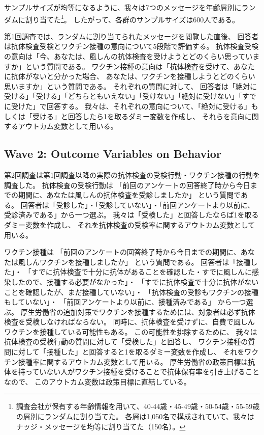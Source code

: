 \documentclass[
  11pt,
  a4paper,
]{article}
\begin{document}
サンプルサイズが均等になるように、我々は7つのメッセージを年齢層別にランダムに割り当てた\footnote{調査会社が保有する年齢情報を用いて、40-44歳・45-49歳・50-54歳・55-59歳の層別にランダムに割り当てた。
  各層は1,050名で構成されていて、我々はナッジ・メッセージを均等に割り当てた（150名）。}。
したがって、各群のサンプルサイズは600人である。

第1回調査では、ランダムに割り当てられたメッセージを閲覧した直後、
回答者は抗体検査受検とワクチン接種の意向について5段階で評価する。
抗体検査受検の意向は「今、あなたは、風しんの抗体検査を受けようとどのくらい思っていますか」という質問である。
ワクチン接種の意向は「抗体検査を受けて、あなたに抗体がないと分かった場合、
あなたは、ワクチンを接種しようとどのくらい思いますか」という質問である。
それぞれの質問に対して、
回答者は「絶対に受ける」「受ける」「どちらともいえない」「受けない」「絶対に受けない」「すでに受けた」で回答する。
我々は、それぞれの意向について、「絶対に受ける」もしくは「受ける」と回答したら1を取るダミー変数を作成し、
それらを意向に関するアウトカム変数として用いる。

\hypertarget{wave2}{%
\subsection{Wave 2: Outcome Variables on Behavior}\label{wave2}}

第2回調査は第1回調査以降の実際の抗体検査の受検行動・ワクチン接種の行動を調査した。
抗体検査の受検行動は
「前回のアンケートの回答終了時から今日までの期間に、あなたは風しんの抗体検査を受診しましたか」
という質問である。
回答者は「受診した」・「受診していない」・「前回アンケートより以前に、受診済みである」から一つ選ぶ。
我々は「受検した」と回答したならば1を取るダミー変数を作成し、
それを抗体検査の受検率に関するアウトカム変数として用いる。

ワクチン接種は
「前回のアンケートの回答終了時から今日までの期間に、あなたは風しんワクチンを接種しましたか」
という質問である。
回答者は「接種した」・
「すでに抗体検査で十分に抗体があることを確認した・すでに風しんに感染したので、接種する必要がなかった」・
「すでに抗体検査で十分に抗体がないことを確認したが、まだ接種していない」・
「抗体検査の受診もワクチンの接種もしていない」・
「前回アンケートより以前に、接種済みである」
から一つ選ぶ。
厚生労働省の追加対策でワクチンを接種するためには、対象者は必ず抗体検査を受検しなければならない。
同時に、抗体検査を受けずに、自費で風しんワクチンを接種している可能性もある。
この可能性を排除するために、
我々は抗体検査の受検行動の質問に対して「受検した」と回答し、
ワクチン接種の質問に対して「接種した」と回答すると1を取るダミー変数を作成し、
それをワクチン接種率に関するアウトカム変数として用いる。
厚生労働省の政策目標は抗体を持っていない人がワクチン接種を受けることで抗体保有率を引き上げることなので、
このアウトカム変数は政策目標に直結している。
\end{document}
